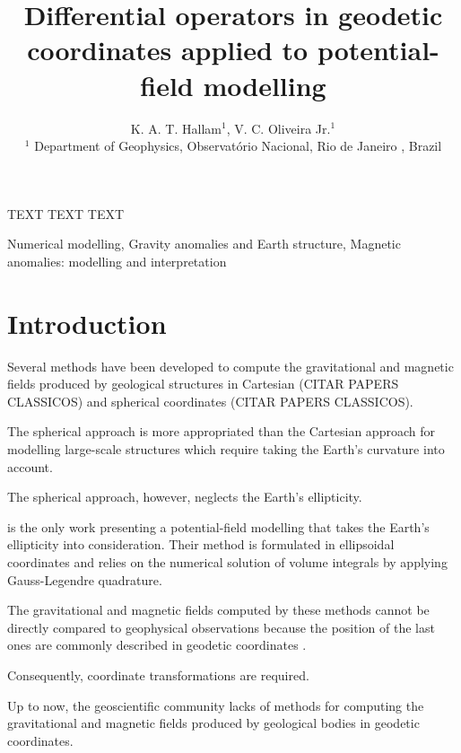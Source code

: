 \documentclass[mreferee]{gji}
\title[Differential operators in geodetic coordinates] %
  {Differential operators in geodetic coordinates applied to potential-field modelling} %
\author[K. A. T. Hallam, V. C. Oliveira Jr.] %
  {K. A. T. Hallam$^1$, V. C. Oliveira Jr.$^1$ %
  \\
  $^1$ Department of Geophysics, Observat\'{o}rio Nacional, Rio de Janeiro
  , Brazil
  }
\begin{document}
\label{firstpage}

\maketitle


\begin{summary}


TEXT TEXT TEXT


\end{summary}


\begin{keywords}
Numerical modelling, Gravity anomalies and Earth structure, Magnetic anomalies: modelling and interpretation
\end{keywords}


\section{Introduction} \label{sec.intro}


Several methods have been developed to
compute the gravitational and magnetic fields produced by
geological structures in Cartesian (CITAR PAPERS CLASSICOS)
and spherical coordinates (CITAR PAPERS CLASSICOS).

The spherical approach is more appropriated than the Cartesian approach
for modelling large-scale structures which require taking the Earth's
curvature into account.

The spherical approach, however, neglects the Earth's ellipticity.

\citet{roussel2015} is the only work presenting a potential-field modelling
that takes the Earth's ellipticity into consideration.
Their method is formulated in ellipsoidal coordinates and
relies on the numerical solution of volume integrals by applying
Gauss-Legendre quadrature.

The gravitational and magnetic fields computed by these methods cannot
be directly compared to geophysical observations because the position of
the last ones are commonly described in geodetic coordinates  
\citep[e.g.,][]{hotine1969, heiskanen-moritz1967, krakiwsky1971, soler1976,
vanicek1987, rapp1991, seeber2003, hofmann-wellenhof-moritz2005, torge2012}.

Consequently, coordinate transformations are required.

Up to now, the geoscientific community lacks of methods for computing
the gravitational and magnetic fields produced by geological bodies
in geodetic coordinates.
\end{document}
